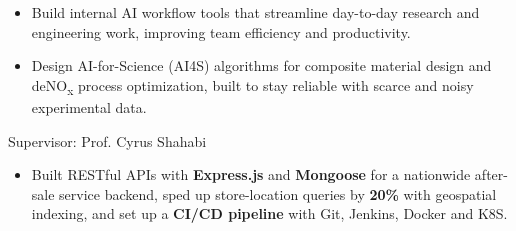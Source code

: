 \documentclass{resume}
\begin{document}
\begin{itemize}
  \item Build internal AI workflow tools that streamline day-to-day research and engineering work, improving team efficiency and productivity.
  \item Design AI-for-Science (AI4S) algorithms for composite material design and deNO\textsubscript{x} process optimization, built to stay reliable with scarce and noisy experimental data.
\end{itemize}

  Supervisor: Prof. Cyrus Shahabi

\begin{itemize}
  \item Built RESTful APIs with \textbf{Express.js} and \textbf{Mongoose} for a nationwide after-sale service backend, sped up store-location queries by \textbf{20\%} with geospatial indexing, and set up a \textbf{CI/CD pipeline} with Git, Jenkins, Docker and K8S.
\end{itemize}
\end{document}
